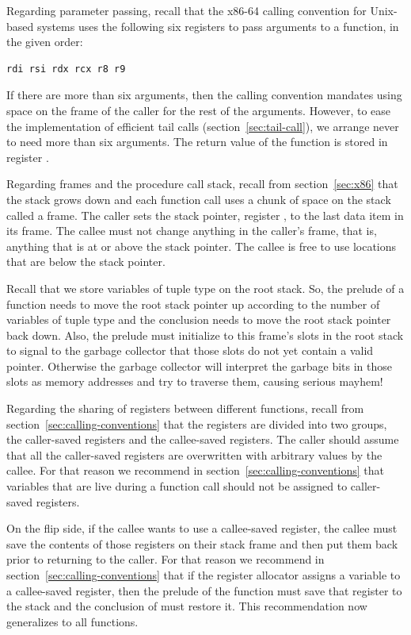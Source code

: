 \documentclass[7x10]{TimesAPriori_MIT}%
\numberwithin{theorem}{chapter}
\numberwithin{definition}{chapter}
\numberwithin{equation}{chapter}
\begin{document}
Regarding parameter passing, recall that the x86-64 calling
convention for Unix-based systems uses the following six registers to
pass arguments to a function, in the given order:
\begin{lstlisting}
rdi rsi rdx rcx r8 r9
\end{lstlisting}
If there are more than six arguments, then the calling convention
mandates using space on the frame of the caller for the rest of the
arguments. However, to ease the implementation of efficient tail calls
(section~\ref{sec:tail-call}), we arrange never to need more than six
arguments.
%
The return value of the function is stored in register .

Regarding frames  and the procedure call stack,
 recall from
section~\ref{sec:x86} that the stack grows down and each function call
uses a chunk of space on the stack called a frame. The caller sets the
stack pointer, register , to the last data item in its
frame. The callee must not change anything in the caller's frame, that
is, anything that is at or above the stack pointer. The callee is free
to use locations that are below the stack pointer.

Recall that we store variables of tuple type on the root stack.  So,
the prelude of a function needs to move the
root stack pointer  up according to the number of variables
of tuple type and the conclusion needs to
move the root stack pointer back down.  Also, the prelude must
initialize to  this frame's slots in the root stack to signal
to the garbage collector that those slots do not yet contain a valid
pointer. Otherwise the garbage collector will interpret the garbage
bits in those slots as memory addresses and try to traverse them,
causing serious mayhem!

Regarding the sharing of registers between different functions, recall
from section~\ref{sec:calling-conventions} that the registers are
divided into two groups, the caller-saved registers and the
callee-saved registers. The caller should assume that all the
caller-saved registers are overwritten with arbitrary values by the
callee. For that reason we recommend in
section~\ref{sec:calling-conventions} that variables that are live
during a function call should not be assigned to caller-saved
registers.

On the flip side, if the callee wants to use a callee-saved register,
the callee must save the contents of those registers on their stack
frame and then put them back prior to returning to the caller.  For
that reason we recommend in section~\ref{sec:calling-conventions} that if
the register allocator assigns a variable to a callee-saved register,
then the prelude of the  function must save that register
to the stack and the conclusion of  must restore it.  This
recommendation now generalizes to all functions.
\end{document}
